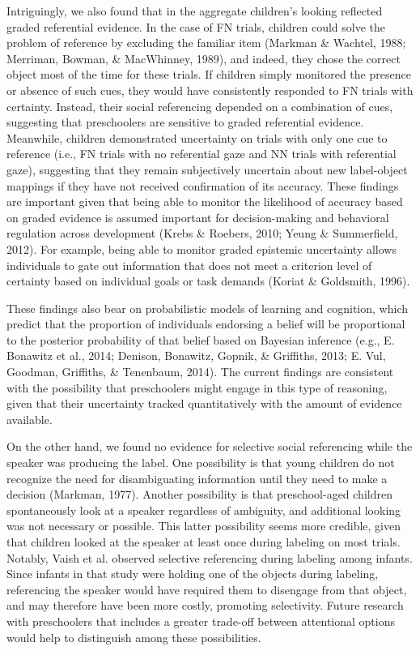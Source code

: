 \documentclass[a4paper,man,apacite,floatsintext]{apa6}
\begin{document}
Intriguingly, we also found that in the aggregate children's looking
reflected graded referential evidence. In the case of FN trials,
children could solve the problem of reference by excluding the familiar
item (Markman \& Wachtel, 1988; Merriman, Bowman, \& MacWhinney, 1989),
and indeed, they chose the correct object most of the time for these
trials. If children simply monitored the presence or absence of such
cues, they would have consistently responded to FN trials with
certainty. Instead, their social referencing depended on a combination
of cues, suggesting that preschoolers are sensitive to graded
referential evidence. Meanwhile, children demonstrated uncertainty on
trials with only one cue to reference (i.e., FN trials with no
referential gaze and NN trials with referential gaze), suggesting that
they remain subjectively uncertain about new label-object mappings if
they have not received confirmation of its accuracy. These findings are
important given that being able to monitor the likelihood of accuracy
based on graded evidence is assumed important for decision-making and
behavioral regulation across development (Krebs \& Roebers, 2010; Yeung
\& Summerfield, 2012). For example, being able to monitor graded
epistemic uncertainty allows individuals to gate out information that
does not meet a criterion level of certainty based on individual goals
or task demands (Koriat \& Goldsmith, 1996).

These findings also bear on probabilistic models of learning and
cognition, which predict that the proportion of individuals endorsing a
belief will be proportional to the posterior probability of that belief
based on Bayesian inference (e.g., E. Bonawitz et al., 2014; Denison,
Bonawitz, Gopnik, \& Griffiths, 2013; E. Vul, Goodman, Griffiths, \&
Tenenbaum, 2014). The current findings are consistent with the
possibility that preschoolers might engage in this type of reasoning,
given that their uncertainty tracked quantitatively with the amount of
evidence available.

On the other hand, we found no evidence for selective social referencing
while the speaker was producing the label. One possibility is that young
children do not recognize the need for disambiguating information until
they need to make a decision (Markman, 1977). Another possibility is
that preschool-aged children spontaneously look at a speaker regardless
of ambiguity, and additional looking was not necessary or possible. This
latter possibility seems more credible, given that children looked at
the speaker at least once during labeling on most trials. Notably, Vaish
et al. observed selective referencing during labeling among infants.
Since infants in that study were holding one of the objects during
labeling, referencing the speaker would have required them to disengage
from that object, and may therefore have been more costly, promoting
selectivity. Future research with preschoolers that includes a greater
trade-off between attentional options would help to distinguish among
these possibilities.
\end{document}
